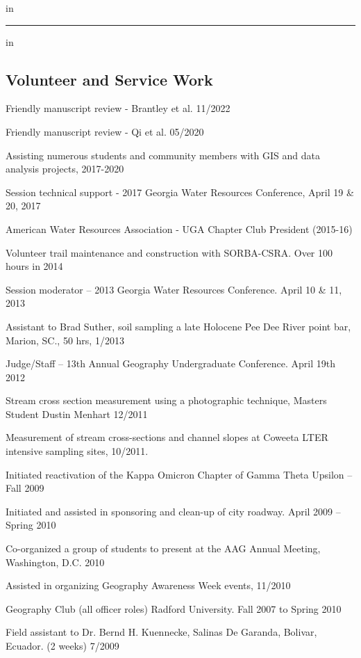 \documentclass[10pt,letterpaper]{article}
\begin{document}
	 in
	
	\hrule
	\vspace{-0.4em}
	 in
	\subsection*{Volunteer and Service Work}
	
	\begin{itemize*}
		
		\item
		Friendly manuscript review - Brantley et al. 11/2022
		\item 
		Friendly manuscript review - Qi et al. 05/2020
		\item
		Assisting numerous students and community members with GIS and data analysis projects, 2017-2020
		\item
		Session technical support - 2017 Georgia Water Resources Conference, April 19 \& 20, 2017
		\item
		American Water Resources Association - UGA Chapter Club President (2015-16)
		\item
		Volunteer trail maintenance and construction with SORBA-CSRA. Over 100 hours in 2014
		\item
		Session moderator – 2013 Georgia Water Resources Conference. April 10 \& 11, 2013
		\item
		Assistant to Brad Suther, soil sampling a late Holocene Pee Dee River point bar, Marion, SC., 50 hrs, 1/2013
		\item
		Judge/Staff – 13th Annual Geography Undergraduate Conference. April 19th 2012
		\item
		Stream cross section measurement using a photographic technique, Masters Student Dustin Menhart 12/2011
		\item 
		Measurement of stream cross-sections and channel slopes at Coweeta LTER intensive sampling sites, 10/2011.
		\item 
		Initiated reactivation of the Kappa Omicron Chapter of Gamma Theta Upsilon – Fall 2009
		\item 
		Initiated and assisted in sponsoring and clean-up of city roadway. April 2009 – Spring 2010
		\item 
		Co-organized a group of students to present at the AAG Annual Meeting, Washington, D.C. 2010
		\item 
		Assisted in organizing Geography Awareness Week events, 11/2010
		\item 
		Geography Club (all officer roles) Radford University. Fall 2007 to Spring 2010
		\item 
		Field assistant to Dr. Bernd H. Kuennecke, Salinas De Garanda, Bolivar, Ecuador. (2 weeks) 7/2009
		
		
	\end{itemize*}
	
	
\end{document}
